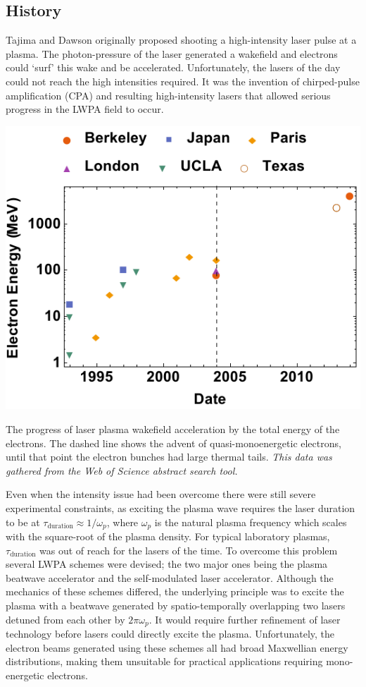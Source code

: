 \documentclass[12pt,letter]{article}
\begin{document}
 \subsection{History}
 \label{sec:history}
Tajima and Dawson originally proposed shooting a high-intensity laser pulse at a
 plasma\cite{PhysRevLett.43.267}. The photon-pressure of the laser
 generated a wakefield and electrons could `surf' this wake and be accelerated.
  Unfortunately, the lasers of the day could not reach the high intensities
  required. It was the invention of 
 chirped-pulse amplification (CPA) and resulting high-intensity lasers that
 allowed serious progress in
 the LWPA field to occur\cite{backus1998high}.
\begin{marginfigure}
	\includegraphics[width=\marginparwidth]{../figures/datfig.pdf}
    \caption{\label{fig:progress}The progress of laser plasma wakefield acceleration by the total
    energy of the electrons. The dashed line shows the advent of
    quasi-monoenergetic electrons, until that point the electron bunches had
    large thermal tails. \em This data was gathered from the Web of Science
abstract search tool.}
\end{marginfigure}Even when the intensity issue had been overcome there were
still severe experimental constraints, as exciting the plasma wave
requires the laser duration to be at $\tau_\textrm{duration} \approx
1/\omega_p$, where $\omega_p$ is the natural plasma frequency which scales with the square-root of the plasma density. For typical
laboratory plasmas, $\tau_\textrm{duration}$ was out of reach for the lasers of
the time. To overcome this problem several LWPA schemes were devised; the two major ones being the plasma beatwave accelerator and the
self-modulated laser accelerator\cite{RevModPhys.81.1229}. Although the mechanics of these schemes
differed, the
underlying principle was to excite the plasma with a beatwave generated by spatio-temporally
overlapping two lasers detuned from each other by $2\pi\omega_p$. It would
require further refinement of laser technology before lasers could directly
excite the plasma. Unfortunately, the electron beams generated using these
schemes all had broad
Maxwellian energy distributions, making them unsuitable for practical
applications requiring mono-energetic electrons.
\end{document}
